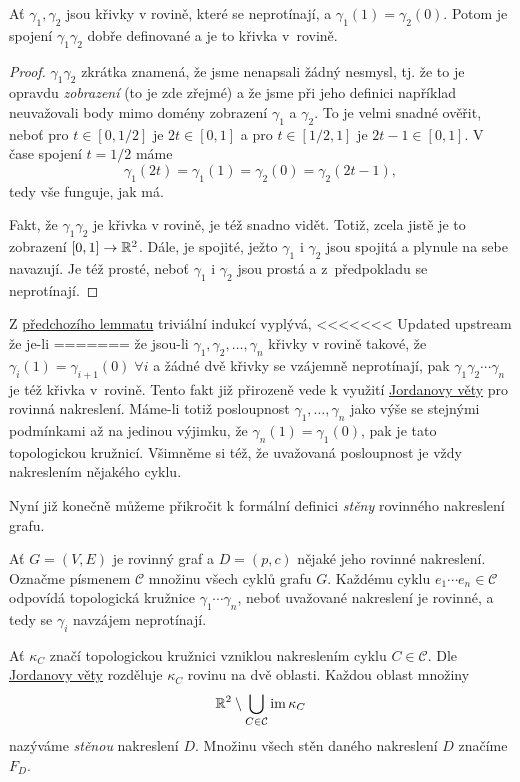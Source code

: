 \begin{lemma}
 \label{lem:spojeni-krivek}
 Ať $\gamma_1,\gamma_2$ jsou křivky v rovině, které se neprotínají, a
 $\gamma_1(1) = \gamma_2(0)$. Potom je spojení $\gamma_1\gamma_2$ dobře
 definované a je to křivka v~rovině.
\end{lemma}
\begin{proof}
  $\gamma_1\gamma_2$ zkrátka znamená, že jsme nenapsali
 žádný nesmysl, tj. že to je opravdu \emph{zobrazení} (to je zde zřejmé) a že
 jsme při jeho definici například neuvažovali body mimo domény zobrazení
 $\gamma_1$ a $\gamma_2$. To je velmi snadné ověřit, neboť pro $t \in [0,1 / 2]$
 je $2t \in [0,1]$ a pro $t \in [1 / 2,1]$ je $2t-1 \in [0,1]$. V čase spojení
 $t = 1 / 2$ máme
 \[
  \gamma_1(2t) = \gamma_1(1) = \gamma_2(0) = \gamma_2(2t - 1),
 \]
 tedy vše funguje, jak má.

 Fakt, že $\gamma_1\gamma_2$ je křivka v rovině, je též snadno vidět. Totiž,
 zcela jistě je to zobrazení $[0,1] \to \mathbb{R}^2$. Dále, je spojité, ježto
 $\gamma_1$ i $\gamma_2$ jsou spojitá a plynule na sebe navazují. Je též prosté,
 neboť $\gamma_1$ i $\gamma_2$ jsou prostá a z~předpokladu se neprotínají.
\end{proof}

Z \hyperref[lem:spojeni-krivek]{předchozího lemmatu} triviální indukcí vyplývá,
<<<<<<< Updated upstream
že je-li 
=======
že jsou-li $\gamma_1,\gamma_2,\ldots,\gamma_n$ křivky v rovině takové, že
$\gamma_i(1) = \gamma_{i+1}(0) \; \forall i$ a žádné dvě křivky se vzájemně
neprotínají, pak $\gamma_1\gamma_2\cdots \gamma_n$ je též křivka v~rovině. Tento
fakt již přirozeně vede k využití \hyperref[thm:jordanova-o-kruznici]{Jordanovy
věty} pro rovinná nakreslení. Máme-li totiž posloupnost
$\gamma_1,\ldots,\gamma_n$ jako výše se stejnými podmínkami až na jedinou
výjimku, že $\gamma_n(1) = \gamma_1(0)$, pak je tato topologickou kružnicí.
Všimněme si též, že uvažovaná posloupnost je vždy nakreslením nějakého cyklu.

Nyní již konečně můžeme přikročit k formální definici \emph{stěny} rovinného
nakreslení grafu.

\begin{definition}
 \label{def:stena-rovinneho-nakresleni}
 Ať $G = (V,E)$ je rovinný graf a $D = (p,c)$ nějaké jeho rovinné nakreslení.
 Označme písmenem $\mathcal{C}$ množinu všech cyklů grafu $G$. Každému cyklu
 $e_1\cdots e_n \in \mathcal{C}$ odpovídá topologická kružnice $\gamma_1\cdots
 \gamma_n$, neboť uvažované nakreslení je rovinné, a tedy se $\gamma_i$ navzájem
 neprotínají.

 Ať $\kappa_{C}$ značí topologickou kružnici vzniklou nakreslením cyklu $C \in
 \mathcal{C}$. Dle \hyperref[thm:jordanova-o-kruznici]{Jordanovy věty}
 rozděluje $\kappa_{C}$ rovinu na dvě oblasti. Každou oblast množiny
 \[
  \mathbb{R}^2 \setminus \bigcup_{C \in \mathcal{C}} \operatorname{im} \kappa_C
 \]
 nazýváme \emph{stěnou} nakreslení $D$. Množinu všech stěn daného nakreslení $D$
 značíme $F_D$.
\end{definition}

